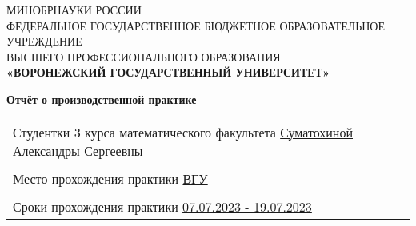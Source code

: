 \thispagestyle{empty}
\begin{center}
	\hfill \break
	\large{МИНОБРНАУКИ РОССИИ}\\
	\footnotesize{ФЕДЕРАЛЬНОЕ ГОСУДАРСТВЕННОЕ БЮДЖЕТНОЕ ОБРАЗОВАТЕЛЬНОЕ УЧРЕЖДЕНИЕ}\\
	\footnotesize{ВЫСШЕГО ПРОФЕССИОНАЛЬНОГО ОБРАЗОВАНИЯ}\\
	\small{\textbf{«ВОРОНЕЖСКИЙ ГОСУДАРСТВЕННЫЙ УНИВЕРСИТЕТ»}}\\

	\hfill \break
	\hfill \break
	\hfill \break
	\hfill \break
	\hfill \break
	\hfill \break
	\hfill \break
	\hfill \break
	\hfill \break

	\large\textbf{Отчёт о производственной практике}\\
\end{center}

\hfill \break
\hfill \break
\hfill \break
\hfill \break
\hfill \break
\hfill \break
\hfill \break


\begin{tabular}{p{}}
	Студентки 3 курса математического факультета \newline
	\underline{Суматохиной Александры Сергеевны} \\
	\\
	Место прохождения практики
	\underline{ВГУ}                              \\
	\\
	Сроки прохождения практики \underline{07.07.2023 - 19.07.2023}
\end{tabular}

\hfill \break
\hfill \break
\hfill \break
\hfill \break
\hfill \break
\hfill \break
\hfill \break
\hfill \break
\hfill \break
\hfill \break
\hfill \break

\newpage